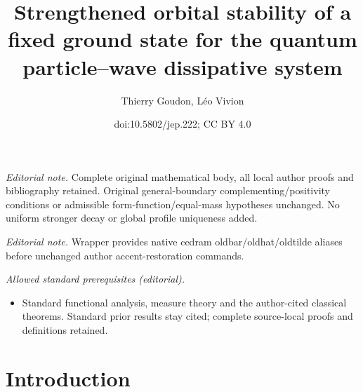 \documentclass[10pt]{amsart}
\title{Strengthened orbital stability of a fixed ground state for the quantum particle–wave dissipative system}
\author{Thierry Goudon, Léo Vivion}
\date{doi:10.5802/jep.222; CC BY 4.0}
\theoremstyle{definition}
\begin{document}
\maketitle
\noindent\textit{Editorial note.} Complete original mathematical body, all local author proofs and bibliography retained. Original general-boundary complementing/positivity conditions or admissible form-function/equal-mass hypotheses unchanged. No uniform stronger decay or global profile uniqueness added.\par\medskip
\noindent\textit{Editorial note.} Wrapper provides native cedram oldbar/oldhat/oldtilde aliases before unchanged author accent-restoration commands.\par\medskip
\noindent\textit{Allowed standard prerequisites (editorial).}\begin{itemize}
\item Standard functional analysis, measure theory and the author-cited classical theorems. Standard prior results stay cited; complete source-local proofs and definitions retained.
\end{itemize}\medskip

\tableofcontents


\section{Introduction}
\end{document}
